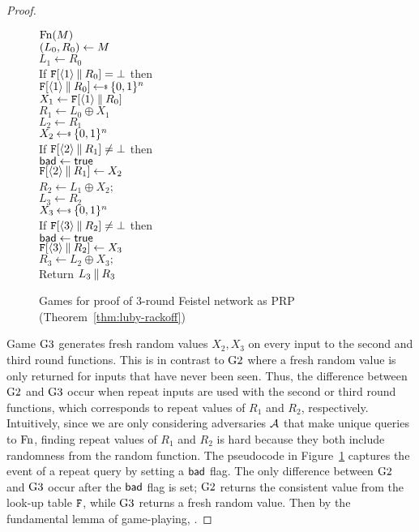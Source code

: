 \begin{proof}
\begin{figure}[t]
{\underline{$\textnormal{Fn}(M)$}\\
$(L_0, R_0) \gets M$\\
$L_1 \gets R_0$\\
If $\mathtt{F}[\langle1\rangle\: \| \: R_0] = \bot$ then\\
\ind $\TabF[\langle1\rangle\concat R_0] \getsr \bits^n$\\
$X_1 \gets \mathtt{F}[\langle1\rangle\: \| \: R_0]$\\
$R_1 \gets L_0 \oplus X_1$\\
$L_2 \gets R_1$\\
$X_2 \getsr \bits^n$\\
If $\mathtt{F}[\langle2\rangle\: \| \: R_1] \ne \bot$ then\\
\ind $\mathsf{bad}\gets\mathsf{true}$\\
$\mathtt{F}[\langle2\rangle\: \| \: R_1] \gets X_2$\\
$R_2 \gets L_1 \oplus X_2$;\;\;\\
$L_3 \gets R_2$\\
$X_3 \getsr \bits^n$\\
If $\mathtt{F}[\langle3\rangle\: \| \: R_2] \ne \bot$ then\\
\ind $\mathsf{bad}\gets\mathsf{true}$\\
$\mathtt{F}[\langle3\rangle\: \| \: R_2] \gets X_3$\\
$R_3 \gets L_2 \oplus X_3;$\;\;\\
Return $L_3 \: \| \: R_3$
}
\caption{Games for proof of 3-round Feistel network as PRP (Theorem~\ref{thm:luby-rackoff})}
\label{fig:games-luby-rackoff}
\end{figure}

Game ${{\textnormal G}}3$ generates fresh random values $X_2, X_3$ on every input to the second and third round functions.
This is in contrast to ${{\textnormal G}}2$ where a fresh random value is only returned for inputs that have never been seen.
Thus, the difference between ${{\textnormal G}}2$ and ${{\textnormal G}}3$ occur when repeat inputs are used with the second or third round functions, which corresponds to repeat values of $R_1$ and $R_2$, respectively.
Intuitively, since we are only considering adversaries ${\mathcal A}$ that make unique queries to $\textnormal{Fn}$, finding repeat values of $R_1$ and $R_2$ is hard because they both include randomness from the random function.
The pseudocode in Figure~\ref{fig:games-luby-rackoff} captures the event of a repeat query by  setting a $\mathsf{bad}$ flag.
The only difference between ${{\textnormal G}}2$ and ${{\textnormal G}}3$ occur after the $\mathsf{bad}$ flag is set; ${{\textnormal G}}2$ returns the consistent value from the look-up table $\mathtt{F}$, while ${{\textnormal G}}3$ returns a fresh random value.
Then by the fundamental lemma of game-playing,
\bnm
{} \le {}.
\enm


\end{proof}

